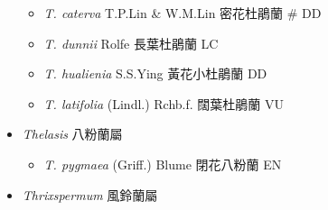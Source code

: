 \begin{itemize}
  \begin{itemize}
        \item[] \textit{T. caterva} T.P.Lin \& W.M.Lin  密花杜鵑蘭  \# DD
        \item[] \textit{T. dunnii} Rolfe  長葉杜鵑蘭   LC
        \item[] \textit{T. hualienia} S.S.Ying  黃花小杜鵑蘭   DD
        \item[] \textit{T. latifolia} (Lindl.) Rchb.f.  闊葉杜鵑蘭   VU
  \end{itemize}
 \item[] \textit{Thelasis} 八粉蘭屬
                                
  \begin{itemize}
        \item[] \textit{T. pygmaea} (Griff.) Blume  閉花八粉蘭   EN
  \end{itemize}
 \item[] \textit{Thrixspermum} 風鈴蘭屬
                                

\end{itemize}
